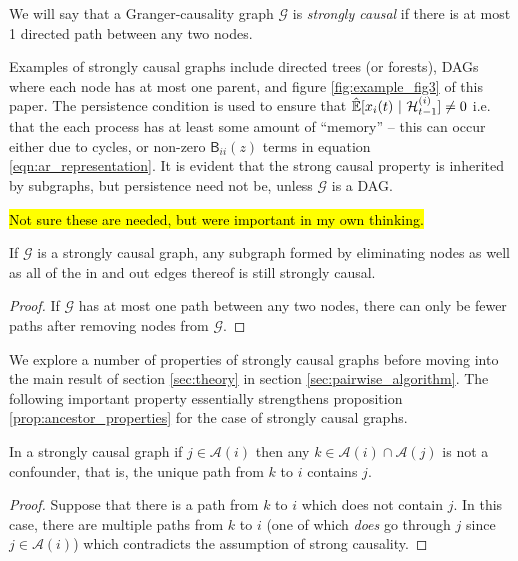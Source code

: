 \documentclass[12pt]{article}
\def\gcg{\mathcal{G}}  %
\def\B{\mathsf{B}}  %
\def\H{\mathcal{H}}  %
\newcommand{\linE}[2]{\hat{\E}[#1\ |\ #2]}  %
\newcommand{\anc}[1]{\mathcal{A}(#1)}  %
\begin{document}
\begin{definition}
  \label{def:strongly_causal}
  We will say that a Granger-causality graph $\gcg$ is
  \textit{strongly causal} if there is at most 1 directed path between
  any two nodes.
\end{definition}

Examples of strongly causal graphs include directed trees (or
forests), DAGs where each node has at most one parent, and figure
\ref{fig:example_fig3} of this paper.  The persistence condition is
used to ensure that $\linE{x_i(t)}{\H_{t - 1}^{(i)}} \ne 0$ i.e. that
the each process has at least some amount of ``memory'' -- this can
occur either due to cycles, or non-zero $\B_{ii}(z)$ terms in equation
\eqref{eqn:ar_representation}.  It is evident that the strong causal property
is inherited by subgraphs, but persistence need not be, unless $\gcg$ is a DAG.

\hl{Not sure these are needed, but were important in my own thinking.}

\begin{lemma}
  \label{lem:still_strongly_causal}
  If $\gcg$ is a strongly causal graph, any subgraph formed by eliminating nodes
  as well as all of the in and out edges thereof is still strongly causal.
\end{lemma}
\begin{proof}
  If $\gcg$ has at most one path between any two nodes, there can only
  be fewer paths after removing nodes from $\gcg$.
\end{proof}


We explore a number of properties of strongly causal graphs before
moving into the main result of section \ref{sec:theory} in section
\ref{sec:pairwise_algorithm}.  The following important property
essentially strengthens proposition \ref{prop:ancestor_properties}
for the case of strongly causal graphs.

\begin{proposition}
  \label{prop:sc_graph_common_anc}
  In a strongly causal graph if $j \in \anc{i}$ then any
  $k \in \anc{i} \cap \anc{j}$ is not a confounder, that is,
  the unique path from $k$ to $i$ contains $j$.
\end{proposition}
\begin{proof}
  Suppose that there is a path from $k$ to $i$ which does not contain
  $j$.  In this case, there are multiple paths from $k$ to $i$ (one of
  which \textit{does} go through $j$ since $j \in \anc{i}$) which
  contradicts the assumption of strong causality.
\end{proof}
\end{document}
